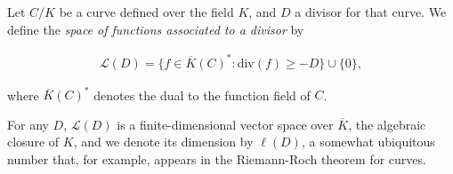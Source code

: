 \documentclass[12pt]{article}
\newcommand{\mc}{\mathcal}
\newcommand{\ol}{\overline}
\newcommand{\<}{\langle}
\renewcommand{\>}{\rangle}
\begin{document}
Let $C/K$ be a curve defined over the field $K$, and $D$ a divisor for that curve.  We define the \emph{space of functions associated to a divisor} by 

\begin{align*}
\mathcal{L}(D)=\{f\in \ol{K}(C)^*:\text{div}(f)\geq -D\}\cup\{0\},
\end{align*}

where $\ol{K}(C)^*$ denotes the dual to the function field of $C$.

For any $D$, $\mc{L}(D)$ is a finite-dimensional vector space over $\ol{K}$, the algebraic closure of $K$, and we denote its dimension by $\ell(D)$, a somewhat ubiquitous number that, for example, appears in the Riemann-Roch theorem for curves.
\end{document}

